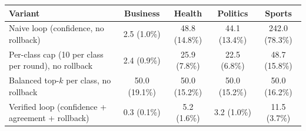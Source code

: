 \begin{tabular}{lcccc}
\toprule
Variant & Business & Health & Politics & Sports \\
\midrule
Naive loop (confidence, no rollback) & 2.5 (1.0\%) & 48.8 (14.8\%) & 44.1 (13.4\%) & 242.0 (78.3\%) \\
Per-class cap (10 per class per round), no rollback & 2.4 (0.9\%) & 25.9 (7.8\%) & 22.5 (6.8\%) & 48.7 (15.8\%) \\
Balanced top-$k$ per class, no rollback & 50.0 (19.1\%) & 50.0 (15.2\%) & 50.0 (15.2\%) & 50.0 (16.2\%) \\
Verified loop (confidence + agreement + rollback) & 0.3 (0.1\%) & 5.2 (1.6\%) & 3.2 (1.0\%) & 11.5 (3.7\%) \\
\bottomrule
\end{tabular}
